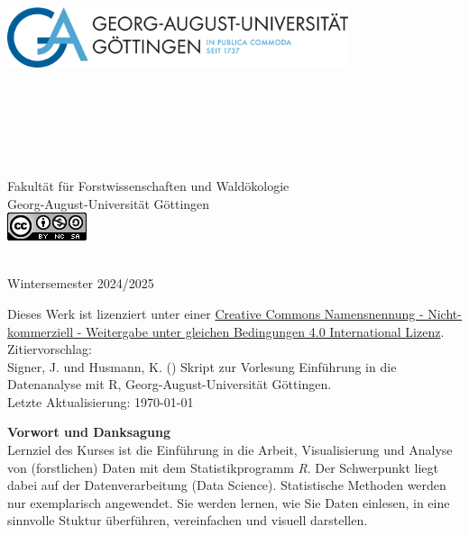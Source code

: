 \begin{titlepage}
\begin{center}
\vfill
\includegraphics[width=10cm,height=8cm]{misc/fig/logo-uni-neu.png}
~\\[0.4cm]

Fakultät für Forstwissenschaften und Waldökologie \\
Georg-August-Universität Göttingen \\[1.2cm]
\includegraphics{misc/fig/logo_cc.png}
\vfill

\hRule ~\\[0.5cm]
{\large Wintersemester 2024/2025}\\


\end{center}
\newpage
\vspace*{\fill}
Dieses Werk ist lizenziert unter einer \href{https://creativecommons.org/licenses/by-nc-sa/4.0/}{Creative Commons Namensnennung - Nicht-kommerziell - Weitergabe unter gleichen Bedingungen 4.0 International Lizenz}. \\[1cm]
Zitiervorschlag: \\
Signer, J. und Husmann, K. (\the\year{}) Skript zur Vorlesung Einführung in die Datenanalyse mit R, Georg-August-Universität Göttingen.
~\\[1cm]
Letzte Aktualisierung: \today

\newpage

{\bf Vorwort und Danksagung} \\[0.5cm]

Lernziel des Kurses ist die Einführung in die Arbeit, Visualisierung und Analyse von (forstlichen) Daten mit dem Statistikprogramm \textit{R}. Der Schwerpunkt liegt dabei auf der Datenverarbeitung (Data Science). Statistische Methoden werden nur exemplarisch angewendet. Sie werden lernen, wie Sie Daten einlesen, in eine sinnvolle Stuktur überführen, vereinfachen und visuell darstellen.


\end{titlepage}
